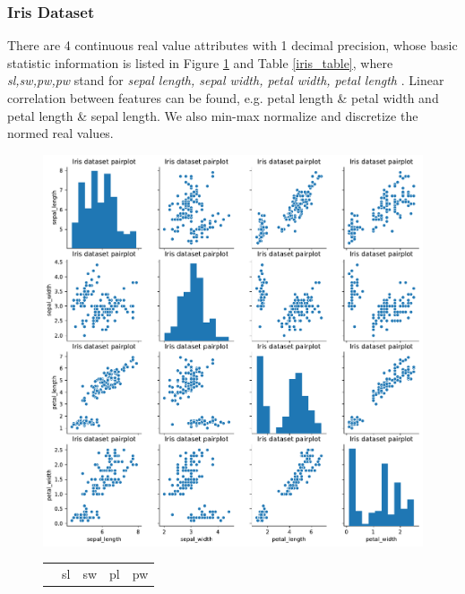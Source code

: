\documentclass[11pt]{scrartcl}
\begin{document}
\subsubsection*{Iris Dataset}
There are 4 continuous real value attributes with 1 decimal precision, whose basic statistic information is listed in Figure \ref{iris_des} and Table \ref{iris_table}, where \textit{sl,sw,pw,pw} stand for \textit{sepal length, sepal width, petal width, petal length} \cite{fisher1936use}. Linear correlation between features can be found, e.g. petal length \& petal width and petal length \& sepal length. We also min-max normalize and discretize the normed real values.

\begin{figure}[H]
	\begin{minipage}{0.8\linewidth}
		\begin{minipage}[b]{0.5\linewidth}
		  \centering
		  \includegraphics[width= \linewidth]{fig/iris_pairplot.pdf}
		  \label{iris_des}
		\end{minipage}
		\hfill
		\begin{minipage}[b]{0.4\linewidth}
		  \centering
			\begin{tabular}{c|cccc}
				\hline
				 & sl & sw & pl & pw \\

\end{tabular}
\end{minipage}
\end{minipage}
\end{figure}
\end{document}
